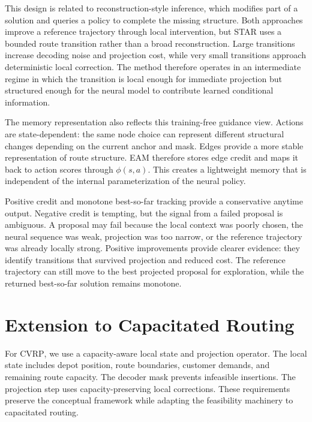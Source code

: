 \documentclass[11pt]{article}
\newcommand{\CVRP}{\textsc{CVRP}}
\newcommand{\EAM}{\textsc{EAM}}
\begin{document}
This design is related to reconstruction-style inference, which modifies part of a solution and queries a policy to complete the missing structure. Both approaches improve a reference trajectory through local intervention, but STAR uses a bounded route transition rather than a broad reconstruction. Large transitions increase decoding noise and projection cost, while very small transitions approach deterministic local correction. The method therefore operates in an intermediate regime in which the transition is local enough for immediate projection but structured enough for the neural model to contribute learned conditional information.

The memory representation also reflects this training-free guidance view. Actions are state-dependent: the same node choice can represent different structural changes depending on the current anchor and mask. Edges provide a more stable representation of route structure. \EAM{} therefore stores edge credit and maps it back to action scores through $\phi(s,a)$. This creates a lightweight memory that is independent of the internal parameterization of the neural policy.

Positive credit and monotone best-so-far tracking provide a conservative anytime output. Negative credit is tempting, but the signal from a failed proposal is ambiguous. A proposal may fail because the local context was poorly chosen, the neural sequence was weak, projection was too narrow, or the reference trajectory was already locally strong. Positive improvements provide clearer evidence: they identify transitions that survived projection and reduced cost. The reference trajectory can still move to the best projected proposal for exploration, while the returned best-so-far solution remains monotone.

\section{Extension to Capacitated Routing}

For \CVRP{}, we use a capacity-aware local state and projection operator. The local state includes depot position, route boundaries, customer demands, and remaining route capacity. The decoder mask prevents infeasible insertions. The projection step uses capacity-preserving local corrections. These requirements preserve the conceptual framework while adapting the feasibility machinery to capacitated routing.



\end{document}

